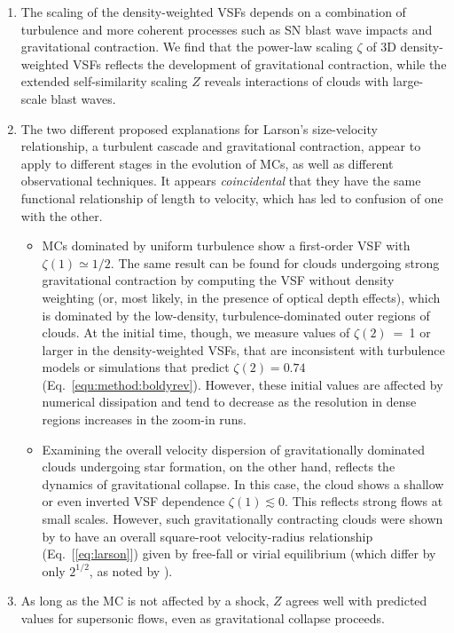 \documentclass{aa}		%
\begin{document}
\begin{enumerate}
	\item The scaling of the density-weighted VSFs depends on a combination of turbulence and more coherent processes such as SN blast wave impacts and gravitational contraction. We find that the power-law scaling $\zeta$ of 3D density-weighted VSFs reflects the development of gravitational contraction, while the extended self-similarity scaling $Z$ reveals interactions of clouds with large-scale blast waves.
    \item The two different proposed explanations for Larson's size-velocity relationship, a turbulent cascade and gravitational contraction,  appear to apply to different stages in the evolution of MCs, as well as different observational techniques. It appears {\em coincidental} that they have the same functional relationship of length to velocity, which has led to confusion of one with the other.
    \begin{itemize}
        \item MCs dominated by uniform turbulence show a first-order VSF with $\zeta(1) \simeq 1/2$.
        The same result can be found for clouds undergoing strong gravitational contraction by computing the VSF without density weighting (or, most likely, in the presence of optical depth effects), which is dominated by the low-density, turbulence-dominated outer regions of clouds.
        At the initial time, though, we measure values of $\zeta(2)$~=~1 or larger in the density-weighted VSFs, that are inconsistent with turbulence models or simulations that predict $\zeta(2) = 0.74$ (Eq.~\ref{equ:method:boldyrev}).
        However, these initial values are affected by numerical dissipation and tend to decrease as the resolution in dense regions increases in the zoom-in runs.
        \item Examining the overall velocity dispersion of gravitationally dominated clouds undergoing star formation, on the other hand, reflects the dynamics of gravitational collapse.
        In this case, the cloud shows a shallow or even inverted VSF dependence $\zeta(1) \lesssim 0$. 
        This reflects strong flows at small scales. However, such gravitationally contracting clouds were shown by  to have an overall square-root velocity-radius relationship (Eq.~[\ref{eq:larson}]) given by free-fall or virial equilibrium (which differ by only $2^{1/2}$, as noted by \citealt{Ballesteros2011}).
    \end{itemize}
	\item As long as the MC is not affected by a shock, $Z$ agrees well with predicted values for supersonic flows, even as gravitational collapse proceeds.

\end{enumerate}
\end{document}
